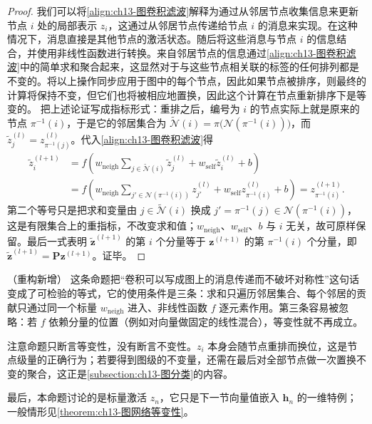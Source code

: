 \documentclass[../../main.tex]{subfiles}
\begin{document}
\begin{proof}
我们可以将\eqref{align:ch13-图卷积滤波}解释为通过从邻居节点收集信息来更新节点 $i$ 处的局部表示 $z_i$，这通过从邻居节点传递给节点 $i$ 的消息来实现。在这种情况下，消息直接是其他节点的激活状态。随后将这些消息与节点 $i$ 的信息结合，并使用非线性函数进行转换。来自邻居节点的信息通过\eqref{align:ch13-图卷积滤波}中的简单求和聚合起来，这显然对于与这些节点相关联的标签的任何排列都是不变的。将以上操作同步应用于图中的每个节点，因此如果节点被排序，则最终的计算将保持不变，但它们也将被相应地置换，因此这个计算在节点重新排序下是等变的。
把上述论证写成指标形式：重排之后，编号为 $i$ 的节点实际上就是原来的节点 $\pi^{-1}(i)$，于是它的邻居集合为 $\widetilde{\mathcal{N}}(i)=\pi\big(\mathcal{N}(\pi^{-1}(i))\big)$，而 $\widetilde z_j^{(l)}=z_{\pi^{-1}(j)}^{(l)}$。代入\eqref{align:ch13-图卷积滤波}得
\begin{align*}
\widetilde z_i^{(l+1)}&=f\!\left(w_{\mathrm{neigh}}\sum_{j\in\widetilde{\mathcal{N}}(i)}\widetilde z_j^{(l)}+w_{\mathrm{self}}\widetilde z_i^{(l)}+b\right)\\
&=f\!\left(w_{\mathrm{neigh}}\sum_{j'\in\mathcal{N}(\pi^{-1}(i))}z_{j'}^{(l)}+w_{\mathrm{self}}z_{\pi^{-1}(i)}^{(l)}+b\right)=z_{\pi^{-1}(i)}^{(l+1)}.
\end{align*}
第二个等号只是把求和变量由 $j\in\widetilde{\mathcal{N}}(i)$ 换成 $j'=\pi^{-1}(j)\in\mathcal{N}(\pi^{-1}(i))$，这是有限集合上的重指标，不改变求和值；$w_{\mathrm{neigh}}$、$w_{\mathrm{self}}$、$b$ 与 $i$ 无关，故可原样保留。最后一式表明 $\widetilde{\bm{z}}^{(l+1)}$ 的第 $i$ 个分量等于 $\bm{z}^{(l+1)}$ 的第 $\pi^{-1}(i)$ 个分量，即 $\widetilde{\bm{z}}^{(l+1)}=\bm{P}\bm{z}^{(l+1)}$。证毕。
\end{proof}

\begin{remark}（重构新增）
这条命题把“卷积可以写成图上的消息传递而不破坏对称性”这句话变成了可检验的等式，它的使用条件是三条：求和只遍历邻居集合、每个邻居的贡献只通过同一个标量 $w_{\mathrm{neigh}}$ 进入、非线性函数 $f$ 逐元素作用。第三条容易被忽略：若 $f$ 依赖分量的位置（例如对向量做固定的线性混合），等变性就不再成立。\par
注意命题只断言等变性，没有断言不变性。$z_i$ 本身会随节点重排而换位，这是节点级量的正确行为；若要得到图级的不变量，还需在最后对全部节点做一次置换不变的聚合，这正是\cref{subsection:ch13-图分类}的内容。\par
最后，本命题讨论的是标量激活 $z_n$，它只是下一节向量值嵌入 $\bm{h}_n$ 的一维特例；一般情形见\cref{theorem:ch13-图网络等变性}。
\end{remark}
\end{document}
